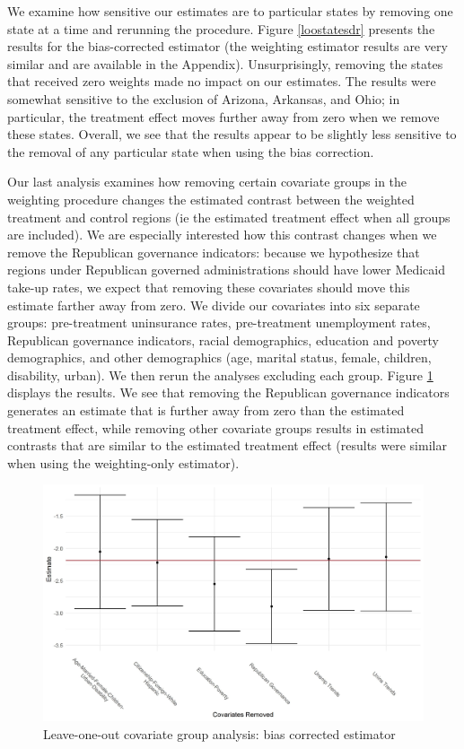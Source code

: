 \documentclass[12pt]{article}
\begin{document}
We examine how sensitive our estimates are to particular states by removing one state at a time and rerunning the procedure. Figure \ref{loostatesdr} presents the results for the bias-corrected estimator (the weighting estimator results are very similar and are available in the Appendix). Unsurprisingly, removing the states that received zero weights made no impact on our estimates. The results were somewhat sensitive to the exclusion of Arizona, Arkansas, and Ohio; in particular, the treatment effect moves further away from zero when we remove these states. Overall, we see that the results appear to be slightly less sensitive to the removal of any particular state when using the bias correction.

Our last analysis examines how removing certain covariate groups in the weighting procedure changes the estimated contrast between the weighted treatment and control regions (ie the estimated treatment effect when all groups are included). We are especially interested how this contrast changes when we remove the Republican governance indicators: because we hypothesize that regions under Republican governed administrations should have lower Medicaid take-up rates, we expect that removing these covariates should move this estimate farther away from zero. We divide our covariates into six separate groups: pre-treatment uninsurance rates, pre-treatment unemployment rates, Republican governance indicators, racial demographics, education and poverty demographics, and other demographics (age, marital status, female, children, disability, urban). We then rerun the analyses excluding each group. Figure \ref{loocovsdr} displays the results. We see that removing the Republican governance indicators generates an estimate that is further away from zero than the estimated treatment effect, while removing other covariate groups results in estimated contrasts that are similar to the estimated treatment effect (results were similar when using the weighting-only estimator). 

\begin{figure}
\begin{center}
    \includegraphics[scale=0.6]{images/loo-covariates-dr.jpeg}
    \caption{Leave-one-out covariate group analysis: bias corrected estimator}
    \label{loocovsdr}
\end{center}
\end{figure}
\end{document}
